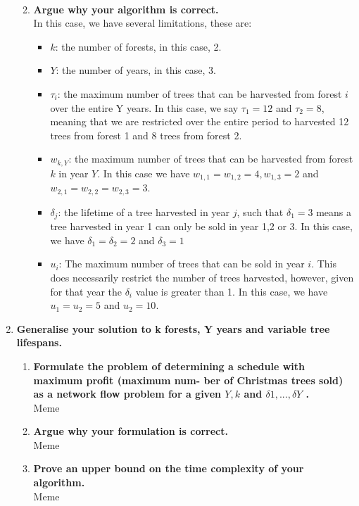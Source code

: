 \documentclass[11pt, oneside]{article}   	%
\begin{document}
\begin{enumerate}
\begin{enumerate}
\\
			\newpage
		\item \textbf{Argue why your algorithm is correct.}\\
		In this case, we have several limitations, these are:
		\begin{itemize}
		\item $k$: the number of forests, in this case, 2.
		\item $Y$: the number of years, in this case, 3.
		\item $\tau_i$: the maximum number of trees that can be harvested from forest $i$ over the entire Y years. In this case, we say $\tau_1=12$ and $\tau_2=8$, meaning that we are restricted over the entire period to harvested 12 trees from forest 1 and 8 trees from forest 2.
		\item $w_{k,Y}$: the maximum number of trees that can be harvested from forest $k$ in year $Y$. In this case we have $w_{1,1}=w_{1,2}=4, w_{1,3}=2$ and $w_{2,1}=w_{2,2}=w_{2,3}=3$.
		\item $\delta_j$: the lifetime of a tree harvested in year $j$, such that $\delta_1=3$ means a tree harvested in year 1 can only be sold in year 1,2 or 3. In this case, we have $\delta_1 =\delta_2 =2$ and $\delta_3 =1$
		\item $u_i$: The maximum number of trees that can be sold in year $i$. This does necessarily restrict the number of trees harvested, however, given for that year the $\delta_i$ value is greater than 1. In this case, we have $u_1=u_2=5$ and $u_2=10$.
		\end{itemize}
	\end{enumerate}
	\item \textbf{Generalise your solution to k forests, Y years and variable tree lifespans.}
	\begin{enumerate}
		\item \textbf{Formulate the problem of determining a schedule with maximum profit (maximum num- ber of Christmas trees sold) as a network flow problem for a given $Y, k$ and $\delta1,...,\delta Y$ .}\\
		Meme
		\item \textbf{Argue why your formulation is correct.}\\
		Meme	
		\item \textbf{Prove an upper bound on the time complexity of your algorithm.}\\
		Meme
		\end{enumerate}

\end{enumerate}
\end{document}
